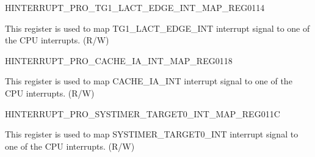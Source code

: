 \begin{register}{H}{INTERRUPT\_PRO\_TG1\_LACT\_EDGE\_INT\_MAP\_REG}{\hexprefix{}0114}\label{regdesc:INTERRUPTPROTG1LACTEDGEINTMAPREG}
%
%
\regnewline%
\begin{regdesc}\begin{reglist}
\label{fielddesc:INTERRUPTPROTG1LACTEDGEINTMAP}\item [INTERRUPT\_PRO\_TG1\_LACT\_EDGE\_INT\_MAP] This register is used to map TG1\_LACT\_EDGE\_INT interrupt signal to one of the CPU interrupts. (R/W)
\end{reglist}\end{regdesc}
\end{register}


\begin{register}{H}{INTERRUPT\_PRO\_CACHE\_IA\_INT\_MAP\_REG}{\hexprefix{}0118}\label{regdesc:INTERRUPTPROCACHEIAINTMAPREG}
%
%
\regnewline%
\begin{regdesc}\begin{reglist}
\label{fielddesc:INTERRUPTPROCACHEIAINTMAP}\item [INTERRUPT\_PRO\_CACHE\_IA\_INT\_MAP] This register is used to map CACHE\_IA\_INT interrupt signal to one of the CPU interrupts. (R/W)
\end{reglist}\end{regdesc}
\end{register}


\begin{register}{H}{INTERRUPT\_PRO\_SYSTIMER\_TARGET0\_INT\_MAP\_REG}{\hexprefix{}011C}\label{regdesc:INTERRUPTPROSYSTIMERTARGET0INTMAPREG}
%
%
\regnewline%
\begin{regdesc}\begin{reglist}
\label{fielddesc:INTERRUPTPROSYSTIMERTARGET0INTMAP}\item [INTERRUPT\_PRO\_SYSTIMER\_TARGET0\_INT\_MAP] This register is used to map SYSTIMER\_TARGET0\_INT interrupt signal to one of the CPU interrupts. (R/W)
\end{reglist}\end{regdesc}
\end{register}


